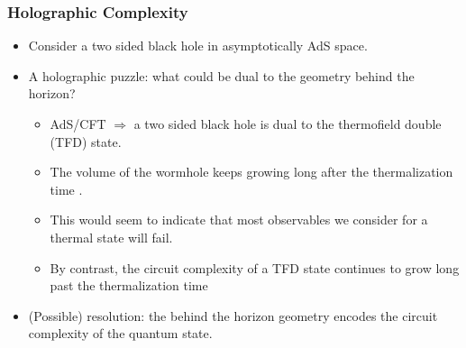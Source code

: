 \documentclass[10pt]{beamer}
\begin{document}
\begin{frame}
\frametitle{Holographic Complexity}

\begin{itemize}

\item Consider a two sided black hole in asymptotically AdS space.

\item A holographic puzzle: what could be dual to the geometry behind the horizon?

	\begin{itemize}
	
	\item AdS/CFT $\Rightarrow$ a two sided black hole is dual to the thermofield double (TFD) state.
	
	\item The volume of the wormhole keeps growing long after the thermalization time	.
	
	\item This would seem to indicate that most observables we consider for a thermal state will fail.
	
	\item By contrast, the circuit complexity of a TFD state continues to grow long past the thermalization time
	
	\end{itemize}
	
\item (Possible) resolution: the behind the horizon geometry encodes the circuit complexity of the quantum state. 

\end{itemize}

\end{frame}
\end{document}
